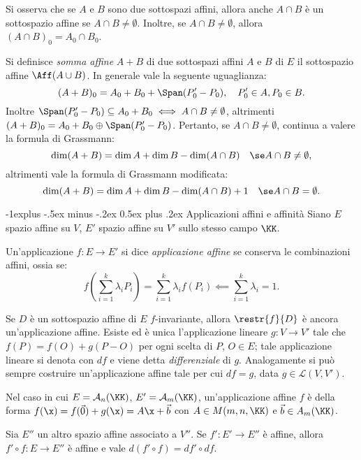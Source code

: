 \documentclass[10pt,landscape]{article}
\makeatletter
\renewcommand{\subsection}{\@startsection{subsection}{2}{0mm}%
	{-1explus -.5ex minus -.2ex}%
	{0.5ex plus .2ex}%
	{\normalfont\normalsize\bfseries}}
\makeatother
\begin{document}
\begin{multicols}{3}
		Si osserva che se $A$ e $B$ sono due sottospazi affini, allora anche
		$A \cap B$ è un sottospazio affine se $A \cap B \neq \emptyset$. Inoltre, se $A \cap B \neq \emptyset$,
		allora $(A \cap B)_0 = A_0 \cap B_0$. \\ \vskip 0.05in
		
		Si definisce \textit{somma affine} $A + B$ di due sottospazi affini $A$ e $B$ di $E$
		il sottospazio affine $\Aff(A \cup B)$. In generale vale la seguente
		uguaglianza:
		\[ (A + B)_0 = A_0 + B_0 + \Span(P_0' - P_0), \quad P_0' \in A, P_0 \in B. \]
		Inoltre $\Span(P_0' - P_0) \subseteq A_0 + B_0 \iff A \cap B \neq \emptyset$,
		altrimenti $(A + B)_0 = A_0 + B_0 \oplus \Span(P_0' - P_0)$. Pertanto, se $A \cap B \neq \emptyset$, continua a valere la formula di Grassmann:
		\[ \dim (A + B) = \dim A + \dim B - \dim (A \cap B) \quad \se A \cap B \neq \emptyset, \]
		altrimenti vale la formula di Grassmann modificata:
		\[ \dim (A + B) = \dim A + \dim B - \dim (A \cap B) + 1 \quad \se A \cap B = \emptyset. \]

        \subsection{Applicazioni affini e affinità}
        Siano $E$ spazio affine su $V$, $E'$ spazio affine su $V'$ sullo stesso campo $\KK$.
        
        Un'applicazione $f:E\rightarrow E'$ si dice \textit{applicazione affine} se conserva le combinazioni affini, ossia se:
        \[ f\left( \sum_{i=1}^k \lambda_i P_i \right) = \sum_{i=1}^k \lambda_i f(P_i) \impliedby \sum_{i=1}^k \lambda_i = 1. \]

        Se $D$ è un sottospazio affine di $E$ $f$-invariante,
        allora $\restr{f}{D}$ è ancora un'applicazione affine.
        Esiste ed è unica l'applicazione lineare $g : V \rightarrow V'$ tale che $f(P)=f(O)+g(P-O)$ per ogni scelta di $P$, $O \in E$; tale applicazione lineare
        si denota con $df$ e viene detta \textit{differenziale} di $g$. Analogamente si può sempre costruire un'applicazione affine tale per cui $df=g$, data
        $g \in \mathcal{L}(V, V')$.

        Nel caso in cui $E=\mathcal{A}_n(\KK)$, $E'=\mathcal{A}_m(\KK)$, un'applicazione affine $f$ è della forma $f(\x)=f(\Vec{0})+g(\x)=A \x+\Vec{b}$ con $A\in M(m,n,\KK)$ e $\Vec{b} \in A_m(\KK)$. \\ \vskip 0.05in

        Sia $E''$ un altro spazio affine associato a $V''$. Se $f':E'\rightarrow E''$ è affine, allora $f'\circ f:E\rightarrow E''$ è affine e vale $d(f' \circ f) = df' \circ df$.


\end{multicols}
\end{document}
